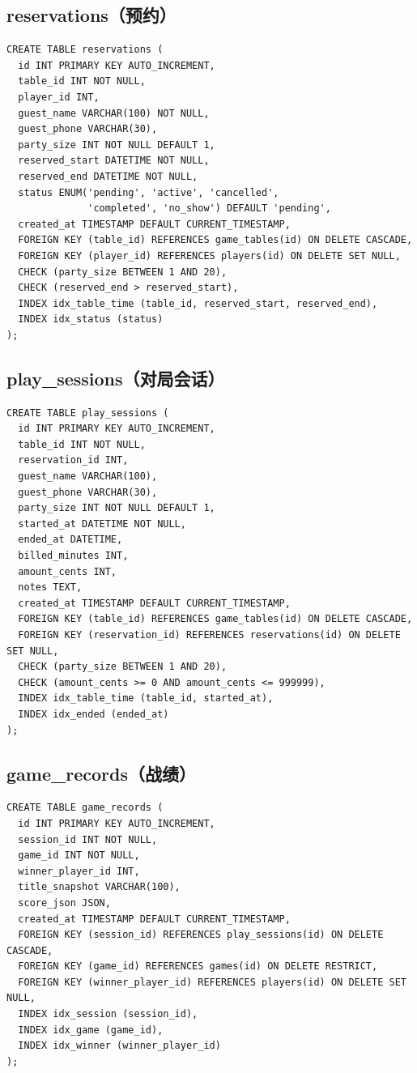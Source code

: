 \subsection{reservations（预约）}

\begin{verbatim}
CREATE TABLE reservations (
  id INT PRIMARY KEY AUTO_INCREMENT,
  table_id INT NOT NULL,
  player_id INT,
  guest_name VARCHAR(100) NOT NULL,
  guest_phone VARCHAR(30),
  party_size INT NOT NULL DEFAULT 1,
  reserved_start DATETIME NOT NULL,
  reserved_end DATETIME NOT NULL,
  status ENUM('pending', 'active', 'cancelled',
              'completed', 'no_show') DEFAULT 'pending',
  created_at TIMESTAMP DEFAULT CURRENT_TIMESTAMP,
  FOREIGN KEY (table_id) REFERENCES game_tables(id) ON DELETE CASCADE,
  FOREIGN KEY (player_id) REFERENCES players(id) ON DELETE SET NULL,
  CHECK (party_size BETWEEN 1 AND 20),
  CHECK (reserved_end > reserved_start),
  INDEX idx_table_time (table_id, reserved_start, reserved_end),
  INDEX idx_status (status)
);
\end{verbatim}

\subsection{play\_sessions（对局会话）}

\begin{lstlisting}
CREATE TABLE play_sessions (
  id INT PRIMARY KEY AUTO_INCREMENT,
  table_id INT NOT NULL,
  reservation_id INT,
  guest_name VARCHAR(100),
  guest_phone VARCHAR(30),
  party_size INT NOT NULL DEFAULT 1,
  started_at DATETIME NOT NULL,
  ended_at DATETIME,
  billed_minutes INT,
  amount_cents INT,
  notes TEXT,
  created_at TIMESTAMP DEFAULT CURRENT_TIMESTAMP,
  FOREIGN KEY (table_id) REFERENCES game_tables(id) ON DELETE CASCADE,
  FOREIGN KEY (reservation_id) REFERENCES reservations(id) ON DELETE SET NULL,
  CHECK (party_size BETWEEN 1 AND 20),
  CHECK (amount_cents >= 0 AND amount_cents <= 999999),
  INDEX idx_table_time (table_id, started_at),
  INDEX idx_ended (ended_at)
);
\end{lstlisting}

\subsection{game\_records（战绩）}

\begin{verbatim}
CREATE TABLE game_records (
  id INT PRIMARY KEY AUTO_INCREMENT,
  session_id INT NOT NULL,
  game_id INT NOT NULL,
  winner_player_id INT,
  title_snapshot VARCHAR(100),
  score_json JSON,
  created_at TIMESTAMP DEFAULT CURRENT_TIMESTAMP,
  FOREIGN KEY (session_id) REFERENCES play_sessions(id) ON DELETE CASCADE,
  FOREIGN KEY (game_id) REFERENCES games(id) ON DELETE RESTRICT,
  FOREIGN KEY (winner_player_id) REFERENCES players(id) ON DELETE SET NULL,
  INDEX idx_session (session_id),
  INDEX idx_game (game_id),
  INDEX idx_winner (winner_player_id)
);
\end{verbatim}

